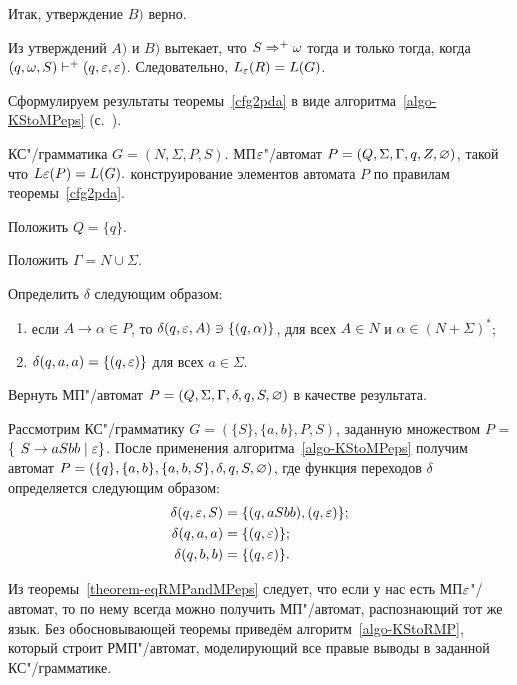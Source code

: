 \begin{myproof}
Итак, утверждение $B)$ верно.

Из утверждений $A)$ и $B)$ вытекает, что $S\Rightarrow^+\omega$ тогда и только тогда, когда $(q,\omega,S)\vdash^+(q,\varepsilon,\varepsilon)$. Следовательно, $L_\varepsilon(R)=L(G)$.
\end{myproof}

Сформулируем результаты теоремы~\ref{cfg2pda} в виде алгоритма~\ref{algo-KStoMPeps} 
(с.~\pageref{algo-KStoMPeps}).

{\label{algo-KStoMPeps} КС"/грамматика $G = (N, \Sigma, P, S)$. }
{МП$\varepsilon$"/автомат $P = (Q, \Sigma, \Gamma, q, Z, \varnothing)$, такой что $L\varepsilon(P) = L(G).$}
{ конструирование элементов автомата $P$ по правилам теоремы~\ref{cfg2pda}.}
{
\item Положить $Q = \{ q \}$.

\item Положить $\Gamma = N \cup \Sigma$.

\item Определить $\delta$ следующим образом:
	\begin{enumerate}[itemindent=\parindent,leftmargin=!]
		\item если $A \to \alpha \in P$, то $\delta(q, \varepsilon, A) \ni \{ (q, \alpha) \}$, для всех $A \in N$ и $\alpha \in (N + \Sigma)^*$;
		\item $\delta(q, a, a) = \{ (q, \varepsilon) \}$ для всех $a \in \Sigma$.
  \end{enumerate}  

\item Вернуть МП"/автомат $P = (Q, \Sigma, \Gamma, \delta, q, S, \varnothing)$ в качестве результата.
}

\begin{myexample}
Рассмотрим КС"/грамматику $G = (\{S\}, \{a, b\}, P, S)$, заданную множеством $P$ = \{
$S \to aSbb \mid \varepsilon \}$.
После применения алгоритма~\ref{algo-KStoMPeps} получим автомат $P = (\{q\},  \{a, b\}, \{a, b, S\}, \delta, q, S, \varnothing)$, где функция переходов $\delta$ определяется следующим образом:
\begin{align*}
    \delta(q, \varepsilon, S) 	&= \{ (q, aSbb), (q, \varepsilon) \}; \\
    \delta(q, a, a) 		&= \{ (q, \varepsilon) \}; \\
    \delta(q, b, b) 		&= \{ (q, \varepsilon) \}. \\
\end{align*}
\end{myexample}

Из теоремы~\ref{theorem-eqRMPandMPeps} следует, что если у нас есть МП$\varepsilon$"/автомат, то по нему всегда можно получить МП"/автомат, распознающий тот же язык. Без обосновывающей теоремы приведём алгоритм~\ref{algo-KStoRMP}, который строит РМП"/автомат, моделирующий все правые выводы в заданной КС"/грамматике.

